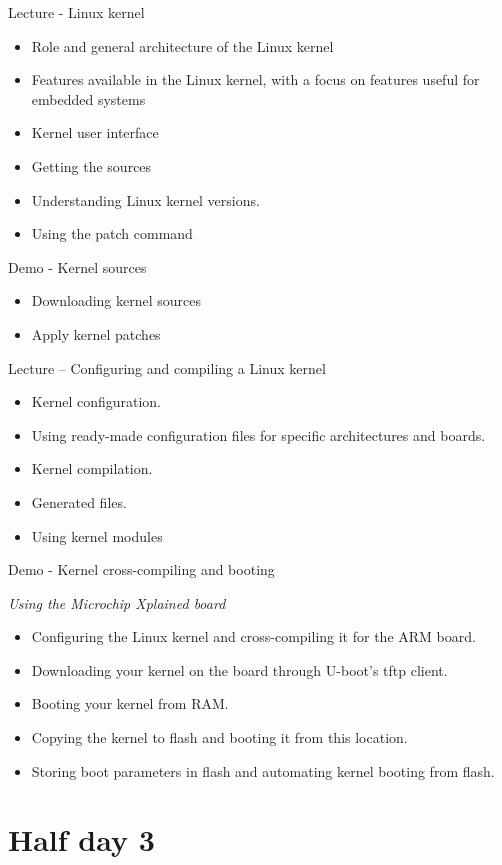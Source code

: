 \documentclass[a4paper,12pt,obeyspaces,spaces,hyphens]{article}
\begin{document}
\feagendatwocolumn
{Lecture - Linux kernel}
{
  \begin{itemize}
  \item Role and general architecture of the Linux kernel
  \item Features available in the Linux kernel,
        with a focus on features useful for embedded systems
  \item Kernel user interface
  \item Getting the sources
  \item Understanding Linux kernel versions.
  \item Using the patch command
  \end{itemize}
}
{Demo - Kernel sources}
{
  \begin{itemize}
  \item Downloading kernel sources
  \item Apply kernel patches
  \end{itemize}
}

\feagendatwocolumn
{Lecture – Configuring and compiling a Linux kernel}
{
  \begin{itemize}
  \item Kernel configuration.
  \item Using ready-made configuration files for specific
    architectures and boards.
  \item Kernel compilation.
  \item Generated files.
  \item Using kernel modules
  \end{itemize}
}
{Demo - Kernel cross-compiling and booting}
{
  {\em Using the Microchip Xplained board}
  \begin{itemize}
  \item Configuring the Linux kernel and cross-compiling it for the ARM board.
  \item Downloading your kernel on the board through U-boot's tftp client.
  \item Booting your kernel from RAM.
  \item Copying the kernel to flash and booting it from this location.
  \item Storing boot parameters in flash and automating kernel booting from flash.
  \end{itemize}
}

\section{Half day 3}
\end{document}
